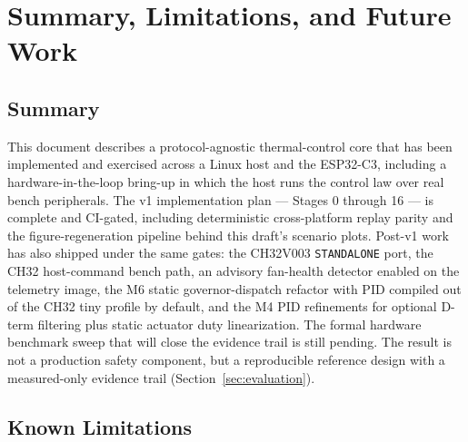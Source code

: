 \section{Summary, Limitations, and Future Work}

\subsection{Summary}

This document describes a protocol-agnostic thermal-control core that has been implemented and exercised across a Linux host and the ESP32-C3, including a hardware-in-the-loop bring-up in which the host runs the control law over real bench peripherals. The v1 implementation plan --- Stages 0 through 16 --- is complete and CI-gated, including deterministic cross-platform replay parity and the figure-regeneration pipeline behind this draft's scenario plots. Post-v1 work has also shipped under the same gates: the CH32V003 \texttt{STANDALONE} port, the CH32 host-command bench path, an advisory fan-health detector enabled on the telemetry image, the M6 static governor-dispatch refactor with PID compiled out of the CH32 tiny profile by default, and the M4 PID refinements for optional D-term filtering plus static actuator duty linearization. The formal hardware benchmark sweep that will close the evidence trail is still pending. The result is not a production safety component, but a reproducible reference design with a measured-only evidence trail (Section~\ref{sec:evaluation}).

\subsection{Known Limitations}

